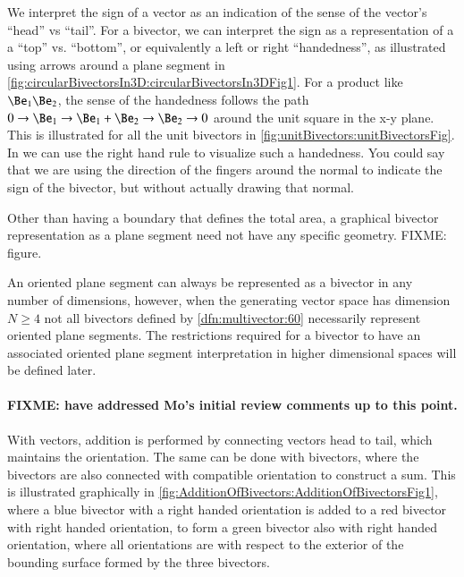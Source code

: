 We interpret the sign of a vector as an indication of the sense of the vector's ``head'' vs ``tail''.
For a bivector, we can interpret the sign as a representation of a 
a ``top'' vs. ``bottom'', or equivalently a left or right ``handedness'', as illustrated using arrows around a plane segment in
\cref{fig:circularBivectorsIn3D:circularBivectorsIn3DFig1}.
For a product like \( \Be_1 \Be_2 \), the sense of the handedness follows the path \( 0 \rightarrow \Be_1 \rightarrow \Be_1 + \Be_2 \rightarrow \Be_2 \rightarrow 0 \) around the unit square in the x-y plane.
This is illustrated for all the unit bivectors in \cref{fig:unitBivectors:unitBivectorsFig}.
In  we can use the right hand rule to visualize such a handedness.  You could say that we are using the direction of the fingers around the normal to indicate the sign of the bivector, but without actually drawing that normal.

Other than having a boundary that defines the total area, a graphical bivector representation as a plane segment need not have any specific geometry.
FIXME: figure.

An oriented plane segment can always be represented as a bivector in any number of dimensions, however, when the generating vector space has dimension \( N \ge 4 \) not all bivectors defined by \cref{dfn:multivector:60} necessarily represent oriented plane segments.
The restrictions required for a bivector to have an associated oriented plane segment interpretation in higher dimensional spaces will be defined later.

\paragraph{FIXME: have addressed Mo's initial review comments up to this point.}

With vectors, addition is performed by connecting vectors head to tail, which maintains the orientation.
The same can be done with bivectors, where the bivectors are also connected with compatible orientation to construct a sum.
This is illustrated graphically in \cref{fig:AdditionOfBivectors:AdditionOfBivectorsFig1}, where a blue bivector with a right handed orientation is added to a red bivector with right handed orientation, to form a green bivector also with right handed orientation, where all orientations are with respect to the exterior of the bounding surface formed by the three bivectors.

